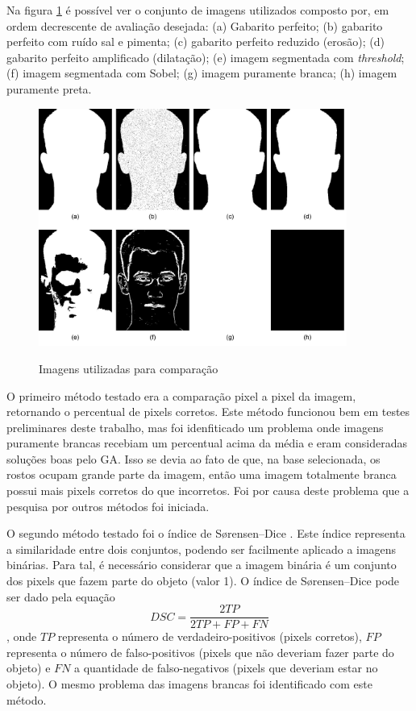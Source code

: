 \documentclass[12pt,oneside,a4paper,english,french,spanish,brazil,]{abntex2}
\begin{document}
Na figura \ref{fig:DES_Imagens_Teste} é possível ver o conjunto de imagens utilizados composto por, em ordem decrescente de avaliação desejada: (a) Gabarito perfeito; (b) gabarito perfeito com ruído sal e pimenta; (c) gabarito perfeito reduzido (erosão); (d) gabarito perfeito amplificado (dilatação); (e) imagem segmentada com \textit{threshold}; (f) imagem segmentada com Sobel; (g) imagem puramente branca; (h) imagem puramente preta.

\begin{figure}[ht]
\centering
\caption{Imagens utilizadas para comparação}
\includegraphics[width=0.9\textwidth]{imagens/DES_Imagens_Teste.pdf}
\sourceAuthor{}
\label{fig:DES_Imagens_Teste}
\end{figure}

O primeiro método testado era a comparação pixel a pixel da imagem, retornando o percentual de pixels corretos. Este método funcionou bem em testes preliminares deste trabalho, mas foi idenfiticado um problema onde imagens puramente brancas recebiam um percentual acima da média e eram consideradas soluções boas pelo GA. Isso se devia ao fato de que, na base selecionada, os rostos ocupam grande parte da imagem, então uma imagem totalmente branca possui mais pixels corretos do que incorretos. Foi por causa deste problema que a pesquisa por outros métodos foi iniciada.

O segundo método testado foi o índice de Sørensen–Dice \cite{sorensen:1948}\cite{dice:1945}. Este índice representa a similaridade entre dois conjuntos, podendo ser facilmente aplicado a imagens binárias. Para tal, é necessário considerar que a imagem binária é um conjunto dos pixels que fazem parte do objeto (valor 1). O índice de Sørensen–Dice pode ser dado pela equação \[DSC = \frac{2TP}{2TP + FP + FN}\], onde \(TP\) representa o número de verdadeiro-positivos (pixels corretos), \(FP\) representa o número de falso-positivos (pixels que não deveriam fazer parte do objeto) e \(FN\) a quantidade de falso-negativos (pixels que deveriam estar no objeto). O mesmo problema das imagens brancas foi identificado com este método.
\end{document}
